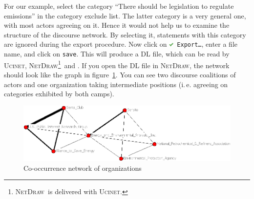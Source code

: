 \documentclass[12pt,a4paper]{scrreprt}
\newcommand{\visonecolor}
{\textsf%
 {\protect\raisebox{.5ex}{\color[rgb]{1,0,0}v}%
  \protect\raisebox{.1ex}{\color[rgb]{0,1,0}i}%
  \protect\raisebox{-.1ex}{\color[rgb]{0,0,1}s}%
  \protect\raisebox{.1ex}{\color[rgb]{1,0.8,0}o}%
  \protect\raisebox{-.1ex}{\color[rgb]{1,0,0.8}n}%
  \protect\raisebox{-.4ex}{\color[rgb]{0,0.8,0.8}e}%
 }%
}
\newcommand{\ucinet}{\textsc{Ucinet}}
\newcommand{\netdraw}{\textsc{NetDraw}}
\newcommand{\code}[1]{\texttt{#1}}
\begin{document}
For our example, select the category ``There should be legislation to regulate emissions'' in the category exclude list. The latter category is a very general one, with most actors agreeing on it. Hence it would not help us to examine the structure of the discourse network. By selecting it, statements with this category are ignored during the export procedure. Now click on \code{\includegraphics[height=9px]{icons-tick.png} Export\ldots}, enter a file name, and click on \code{save}. This will produce a DL file, which can be read by \ucinet, \netdraw\footnote{\netdraw\ is delivered with \ucinet.}\ and \visonecolor. If you open the DL file in \netdraw, the network should look like the graph in figure~\ref{netdraw-cooc}. You can see two discourse coalitions of actors and one organization taking intermediate positions (i.\,e. agreeing on categories exhibited by both camps).
\begin{figure}
 \begin{center}
  \includegraphics[scale=0.4]{netdraw.png}
 \end{center}
 \caption{Co-occurrence network of organizations}
 \label{netdraw-cooc}
\end{figure}
 
\end{document}
